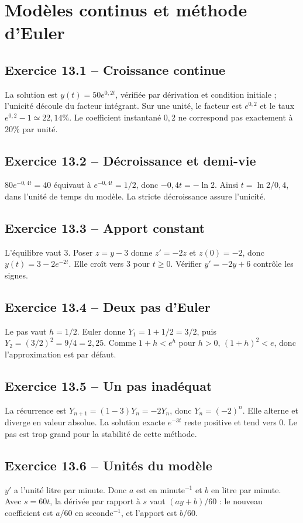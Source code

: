 \chapter{Modèles continus et méthode d'Euler}
\section*{Exercice 13.1 -- Croissance continue}
La solution est $y(t)=50e^{0{,}2t}$, vérifiée par dérivation et condition initiale ; l'unicité découle du facteur intégrant. Sur une unité, le facteur est $e^{0{,}2}$ et le taux $e^{0{,}2}-1\simeq22{,}14\%$. Le coefficient instantané $0{,}2$ ne correspond pas exactement à $20\%$ par unité.

\section*{Exercice 13.2 -- Décroissance et demi-vie}
$80e^{-0{,}4t}=40$ équivaut à $e^{-0{,}4t}=1/2$, donc $-0{,}4t=-\ln2$. Ainsi $t=\ln2/0{,}4$, dans l'unité de temps du modèle. La stricte décroissance assure l'unicité.

\section*{Exercice 13.3 -- Apport constant}
L'équilibre vaut $3$. Poser $z=y-3$ donne $z'=-2z$ et $z(0)=-2$, donc $y(t)=3-2e^{-2t}$. Elle croît vers $3$ pour $t\ge0$. Vérifier $y'=-2y+6$ contrôle les signes.

\section*{Exercice 13.4 -- Deux pas d'Euler}
Le pas vaut $h=1/2$. Euler donne $Y_1=1+1/2=3/2$, puis $Y_2=(3/2)^2=9/4=2{,}25$. Comme $1+h<e^h$ pour $h>0$, $(1+h)^2<e$, donc l'approximation est par défaut.

\section*{Exercice 13.5 -- Un pas inadéquat}
La récurrence est $Y_{n+1}=(1-3)Y_n=-2Y_n$, donc $Y_n=(-2)^n$. Elle alterne et diverge en valeur absolue. La solution exacte $e^{-3t}$ reste positive et tend vers $0$. Le pas est trop grand pour la stabilité de cette méthode.

\section*{Exercice 13.6 -- Unités du modèle}
$y'$ a l'unité litre par minute. Donc $a$ est en minute$^{-1}$ et $b$ en litre par minute. Avec $s=60t$, la dérivée par rapport à $s$ vaut $(ay+b)/60$ : le nouveau coefficient est $a/60$ en seconde$^{-1}$, et l'apport est $b/60$.

